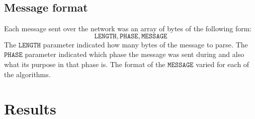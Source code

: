 \subsection{Message format} Each message sent over the network was an array of
bytes of the following form: \begin{equation*} \mathtt{LENGTH}, \mathtt{PHASE},
    \mathtt{MESSAGE} \end{equation*} The $\mathtt{LENGTH}$ parameter indicated
    how many bytes of the message to parse. The $\mathtt{PHASE}$ parameter
    indicated which phase the message was sent during and also what its purpose
    in that phase is. 
The format of the $\mathtt{MESSAGE}$ varied for each of the algorithms.


\section{Results} \label{sec:results}

